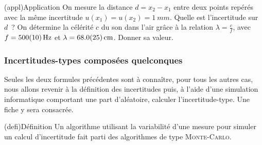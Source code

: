 \documentclass[../../main/main.tex]{subfiles}
\begin{document}
\begin{tcb*}(appl){Application}
	On mesure la distance $d = x_2 - x_1$ entre deux points repérés avec la même
	incertitude $u(x_1) = u(x_2) = \SI{1}{mm}$. Quelle est l'incertitude sur $d$~?
	\smallbreak
	\tcblower
	On détermine la célérité $c$ du son dans l'air grâce à la relation $\lambda =
		\frac{c}{f}$, avec $f = \SI{500 \pm 10}{Hz}$ et $\lambda = \SI{68.0 \pm
			2.5}{cm}$. Donner sa valeur.
	\smallbreak
\end{tcb*}

\subsubsection{Incertitudes-types composées quelconques}
Seules les deux formules précédentes sont à connaître, pour tous les autres cas,
nous allons revenir à la définition des incertitudes puis, à l'aide d'une
simulation informatique comportant une part d'aléatoire, calculer
l'incertitude-type. Une fiche y sera consacrée.
\begin{tcb*}(defi){Définition}
	Un algorithme utilisant la variabilité d'une mesure pour simuler un calcul
	d'incertitude fait parti des algorithmes de type \textsc{Monte-Carlo}.
\end{tcb*}
\end{document}
